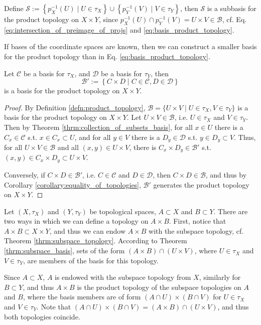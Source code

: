 \begin{remark}\label{remark:subbasis_prod_topology}
	Define $\mathscr S := \left\{ p_X^{-1}(U) \mid U\in\tau_X \right\} \cup \left\{ p_Y^{-1}(V) \mid V\in\tau_Y \right\}$, then $\mathscr S$ is a subbasis for the product topology on $X\times Y$, since $p_X^{-1}(U) \cap p_Y^{-1}(V) = U\times V\in \mathscr B$, cf. Eq. \eqref{eq:intersection_of_preimage_of_projs} and \eqref{eq:basis_product_topology}.
\end{remark}

If bases of the coordinate spaces are known, then we can construct a smaller basis for the product topology than in Eq. \eqref{eq:basis_product_topology}.

\begin{theorem}\label{thrm:basis_product_topology_coarser}
	Let $\mathscr C$ be a basis for $\tau_X$, and $\mathscr D$ be a basis for $\tau_Y$, then
	$$\mathscr B' := \left\{C\times D \mid C\in \mathscr C, D\in \mathscr D\right\}$$
	is a basis for the product topology on $X\times Y$.
\end{theorem}

\begin{proof}
	By Definition \ref{defn:product_topology}, $\mathscr B = \{ U\times V \mid U\in\tau_X, V\in\tau_Y \}$ is a basis for the product topology on $X\times Y$. Let $U\times V\in \mathscr B$, i.e. $U\in\tau_X$ and $V\in\tau_Y$. Then by Theorem \ref{thrm:collection_of_subsets_basis}, for all $x\in U$ there is a $C_x\in \mathscr C$ s.t. $x\in C_x\subset U$, and for all $y\in V$ there is a $D_y\in\mathscr D$ s.t. $y\in D_y\subset V$. Thus, for all $U\times V\in \mathscr B$ and all $(x, y)\in U\times V$, there is $C_x\times D_y\in \mathscr B'$ s.t. $(x, y)\in C_x\times D_y\subset U\times V$.
	
	Conversely, if $C\times D\in \mathscr B'$, i.e. $C\in\mathscr C$ and $D\in\mathscr D$, then $C\times D\in\mathscr B$, and thus by Corollary \ref{corollary:equality_of_topologies}, $\mathscr B'$ generates the product topology on $X\times Y$.
\end{proof}

\begin{remark}
	Let $(X, \tau_X)$ and $(Y, \tau_Y)$ be topological spaces, $A\subset X$ and $B\subset Y$. There are two ways in which we can define a topology on $A\times B$. First, notice that $A\times B\subset X\times Y$, and thus we can endow $A\times B$ with the subspace topology, cf. Theorem \ref{thrm:subspace_topology}. According to Theorem \ref{thrm:subspace_basis}, sets of the form $(A\times B) \cap (U\times V)$, where $U\in\tau_X$ and $V\in\tau_Y$, are members of the basis for this topology.
	
	Since $A\subset X$, $A$ is endowed with the subspace topology from $X$, similarly for $B\subset Y$, and thus $A\times B$ is the product topology of the subspace topologies on $A$ and $B$, where the basis members are of form $(A\cap U)\times (B\cap V)$ for $U\in\tau_X$ and $V\in\tau_Y$. Note that $(A\cap U)\times (B\cap V) = (A\times B)\cap (U\times V)$, and thus both topologies coincide.
\end{remark}

